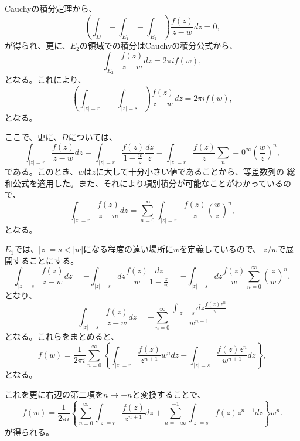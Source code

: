 Cauchyの積分定理から、
\begin{equation}
 \left(\int_D - \int_{E_1} - \int_{E_2}\right)
  \frac{f(z)}{z - w}dz = 0,
\end{equation}
が得られ、更に、$E_2$の領域での積分はCauchyの積分公式から、
\begin{equation}
 \int_{E_2}   \frac{f(z)}{z - w}dz = 2\pi i f(w),
\end{equation}
となる。これにより、
\begin{equation}
 \left(\int_{|z| = r} - \int_{|z| = s}\right)
  \frac{f(z)}{z - w} dz
  = 2\pi i f(w),
\end{equation}
となる。

ここで、更に、$D$については、
\begin{equation}
 \int_{|z| = r}  \frac{f(z)}{z - w} dz
  =  \int_{|z| = r}  \frac{f(z)}{1 - \frac{w}{z}} \frac{dz}{z}
  =  \int_{|z| = r}  \frac{f(z)}{z} 
  \sum_n=0^{\infty} \left(\frac{w}{z}\right)^n,
\end{equation}
である。このとき、$w$は$z$に大して十分小さい値であることから、等差数列の
総和公式を適用した。また、それにより項別積分が可能なことがわかっているの
で、
\begin{equation}
  \int_{|z| = r}  \frac{f(z)}{z - w} dz
  = \sum_{n=0}^{\infty} \int_{|z| = r}  \frac{f(z)}{z} 
  \left(\frac{w}{z}\right)^n,
\end{equation}
となる。

$E_1$では、$|z| = s < |w|$になる程度の遠い場所に$w$を定義しているので、
$z/w$で展開することにする。
\begin{equation}
 \int_{|z| = s} \frac{f(z)}{z - w} dz
  = -  \int_{|z| = s} dz \frac{f(z)}{w} \frac{dz}{1 - \frac{z}{w}}
  = -  \int_{|z| = s} dz \frac{f(z)}{w} 
  \sum_{n=0}^{\infty} \left(\frac{z}{w}\right)^n,
\end{equation}
となり、
\begin{equation}
  \int_{|z| = s} \frac{f(z)}{z - w} dz
  = - \sum_{n=0}^{\infty} 
  \frac{\int_{|z| = s} dz \frac{f(z)z^n}{w}}{w^{n+1}}
\end{equation}
となる。これらをまとめると、
\begin{equation}
 f(w) 
  = \frac{1}{2 \pi i}\sum_{n=0}^{\infty}
  \left\{
   \int_{|z|=r} \frac{f(z)}{z^{n+1}}w^n dz
   - \int_{|z|=s} \frac{f(z)z^n}{w^{n+1}}dz
  \right\},
\end{equation}
となる。

これを更に右辺の第二項を$n\rightarrow -n$と変換することで、
\begin{equation}
 f(w) 
  = \frac{1}{2 \pi i}
  \left\{
   \sum_{n=0}^{\infty}
   \int_{|z|=r} \frac{f(z)}{z^{n+1}} dz
   + \sum_{n=-\infty}^{-1}
   \int_{|z|=s} f(z)z^{n-1}dz
  \right\}w^n.
\end{equation}
が得られる。

